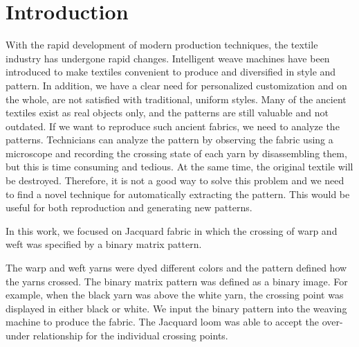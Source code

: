 \section{Introduction}
With the rapid development of modern production techniques, the textile industry has undergone rapid changes. Intelligent weave machines have been introduced to make textiles convenient to produce and diversified in style and pattern. In addition, we have a clear need for personalized customization and on the whole, are not satisfied with traditional, uniform styles. Many of the ancient textiles exist as real objects only, and the patterns are still valuable and not outdated. If we want to reproduce such ancient fabrics, we need to analyze the patterns. Technicians can analyze the pattern by observing the fabric using a microscope and recording the crossing state of each yarn by disassembling them, but this is time consuming and tedious. At the same time, the original textile will be destroyed. Therefore, it is not a good way to solve this problem and we need to find a novel technique for automatically extracting the pattern. This would be useful for both reproduction and generating new patterns.

In this work, we focused on Jacquard fabric in which the crossing of warp and weft was specified by a binary matrix pattern. 


The warp and weft yarns were dyed different colors and the pattern defined how the yarns crossed. The binary matrix pattern was defined as a binary image. For example, when the black yarn was above the white yarn, the crossing point was displayed in either black or white. We input the binary pattern into the weaving machine to produce the fabric. The Jacquard loom was able to accept the over-under relationship for the individual crossing points. 

